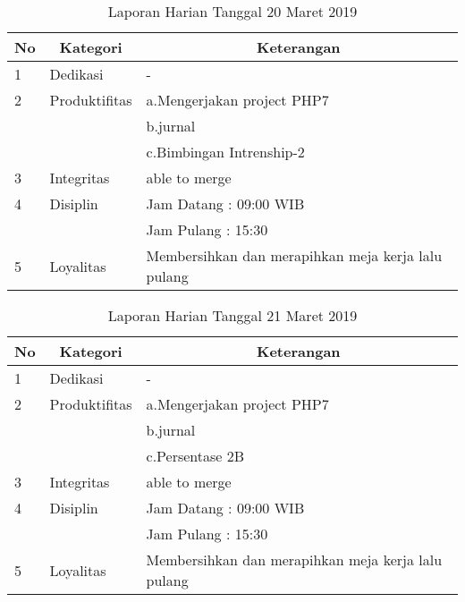 \begin{table}[htp]
\caption{Laporan Harian Tanggal 20 Maret 2019}
\label{tab:lh200319}
\begin{tabular}{|l|l|l|}
\hline
\textbf{No} & \multicolumn{1}{c|}{\textbf{Kategori}} & \multicolumn{1}{c|}{\textbf{Keterangan}} \\ \hline
1 & Dedikasi & - \\ \hline
2 & Produktifitas & a.Mengerjakan project PHP7 \\
   & & b.jurnal \\ \hline
   & & c.Bimbingan Intrenship-2 \\ \hline
3 & Integritas & able to merge \\ \hline
4 & Disiplin & Jam Datang : 09:00 WIB \\
   &  & Jam Pulang : 15:30 \\ \hline
5 & Loyalitas & Membersihkan dan merapihkan meja kerja lalu pulang \\ \hline
\end{tabular}
\end{table}

\begin{table}[htp]
\caption{Laporan Harian Tanggal 21 Maret 2019}
\label{tab:lh210319}
\begin{tabular}{|l|l|l|}
\hline
\textbf{No} & \multicolumn{1}{c|}{\textbf{Kategori}} & \multicolumn{1}{c|}{\textbf{Keterangan}} \\ \hline
1 & Dedikasi & - \\ \hline
2 & Produktifitas & a.Mengerjakan project PHP7 \\
   & & b.jurnal \\ \hline
   & & c.Persentase 2B \\ \hline
3 & Integritas & able to merge \\ \hline
4 & Disiplin & Jam Datang : 09:00 WIB \\
   &  & Jam Pulang : 15:30 \\ \hline
5 & Loyalitas & Membersihkan dan merapihkan meja kerja lalu pulang \\ \hline
\end{tabular}
\end{table}

